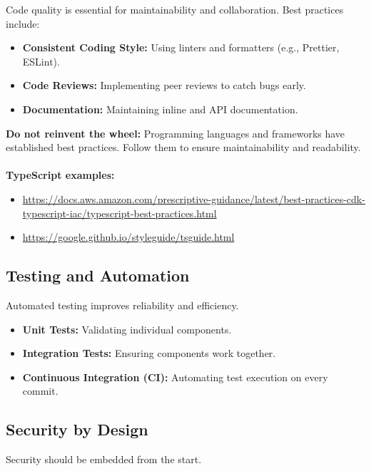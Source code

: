 Code quality is essential for maintainability and collaboration. Best practices include:

\begin{itemize}
    \item \textbf{Consistent Coding Style:} Using linters and formatters (e.g., Prettier, ESLint).
    \item \textbf{Code Reviews:} Implementing peer reviews to catch bugs early.
    \item \textbf{Documentation:} Maintaining inline and API documentation.
\end{itemize}

\begin{tipbox}
    \textbf{Do not reinvent the wheel:} Programming languages and frameworks have established best practices. Follow them to ensure maintainability and readability.\\
    \\
    \textbf{TypeScript examples:}
    \begin{itemize}
        \item \url{https://docs.aws.amazon.com/prescriptive-guidance/latest/best-practices-cdk-typescript-iac/typescript-best-practices.html}
        \item \url{https://google.github.io/styleguide/tsguide.html}
    \end{itemize}
\end{tipbox}

\subsection{Testing and Automation}

Automated testing improves reliability and efficiency.

\begin{itemize}
    \item \textbf{Unit Tests:} Validating individual components.
    \item \textbf{Integration Tests:} Ensuring components work together.
    \item \textbf{Continuous Integration (CI):} Automating test execution on every commit.
\end{itemize}

\subsection{Security by Design}

Security should be embedded from the start.

